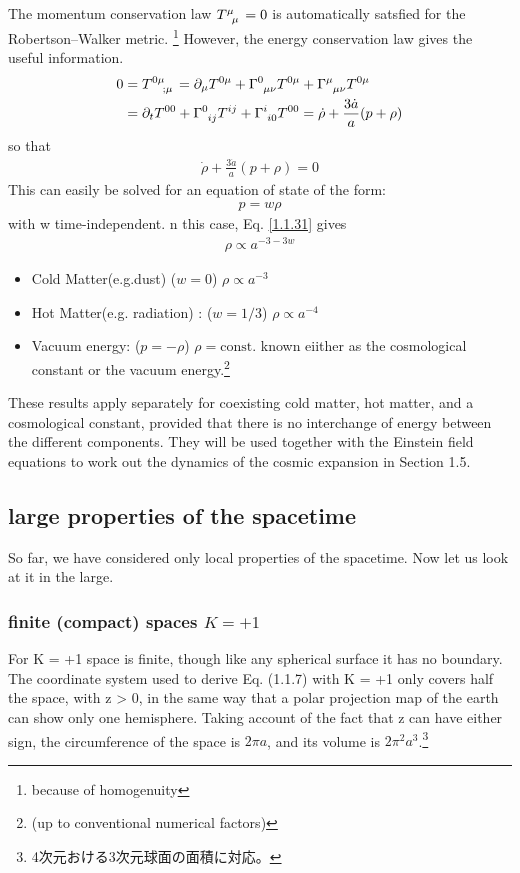 \documentclass[11pt]{ltjsarticle}
\theoremstyle{plain}
\theoremstyle{break}
\begin{document}
The momentum conservation law $\tensor{T}{^{\mu}_{\mu}} = 0$ is automatically satsfied for the Robertson–Walker metric. \footnote{because of homogenuity}
However, the energy conservation law gives the useful information.
\begin{align}
0 &=\tensor{T}{^{0\mu}_{;\mu}}    = \partial_\mu \tensor{T}{^{0\mu}}
 								+ \tensor{\Gamma}{^0_{\mu \nu}}  \tensor{T}{^{0\mu}}
								+\tensor{\Gamma}{^\mu_{\mu \nu}} \tensor{T}{^{0\mu}}  \\
    &= \partial_t \tensor{T}{^{00}} + \tensor{\Gamma}{^0_{ij}} \tensor{T}{^{ij}}
						         + \tensor{\Gamma}{^i_{i0}}\tensor{T}{^{00}}
						         = \dot{\rho} + \frac{3\dot{a}}{a} (p + \rho)
\end{align}%
so that
\begin{align}
	\dot{\rho} + \frac{3 \dot{a}}{a} (p + \rho) =0
\end{align}%
This can easily be solved for an equation of state of the form:
\begin{align}
p = w \rho
\end{align}%
with w time-independent.
n this case, Eq. \eqref{1.1.31} gives
\begin{align}
\rho \propto a^{-3 -3w}
\end{align}%

\begin{itemize}
\item Cold Matter(e.g.dust) ($w=0$) $\rho \propto a^{-3}$
\item Hot Matter(e.g. radiation) : ($w=1/3$)  $\rho \propto a^{-4}$
\item Vacuum energy: ($p = -\rho$) $\rho = \mathrm{const.}$ known eiither as the cosmological constant or the vacuum energy.\footnote{(up to conventional numerical factors)}
\end{itemize}
These results apply separately for coexisting cold matter, hot matter, and a cosmological constant, provided that there is no interchange of energy between the different components. They will be used together with the Einstein field equations to work out the dynamics of the cosmic expansion in Section 1.5.

\subsection{large properties of the spacetime}
So far, we have considered only local properties of the spacetime. Now let us look at it in the large.

\subsubsection{finite (compact) spaces $K=+1$}
For K = +1 space is finite, though like any spherical surface it has no boundary. The coordinate system used to derive Eq. (1.1.7) with K = +1 only covers half the space, with z > 0, in the same way that a polar projection map of the earth can show only one hemisphere. Taking account of the fact that z can have either sign, the circumference of the space is $2\pi a$, and its volume is $2\pi^2 a^3$.\footnote{4次元おける3次元球面の面積に対応。}
\end{document}
